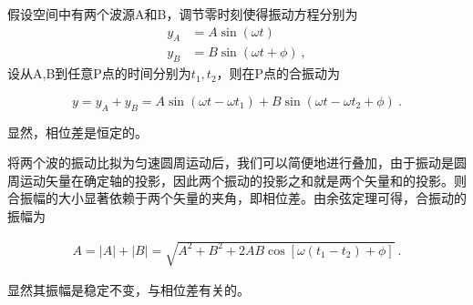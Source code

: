 假设空间中有两个波源A和B，调节零时刻使得振动方程分别为
\begin{equation}
\begin{aligned}
y_A&=A\sin(\omega t)\\
y_B&=B\sin (\omega t+\phi)~,
\end{aligned}
\end{equation}
设从A,B到任意P点的时间分别为$t_1,t_2$，则在P点的合振动为

\begin{equation}
y=y_A+y_B=A\sin(\omega t-\omega t_1)+B\sin(\omega t-\omega t_2+\phi)~.
\end{equation}

显然，相位差是恒定的。

将两个波的振动比拟为匀速圆周运动后，我们可以简便地进行叠加，由于振动是圆周运动矢量在确定轴的投影，因此两个振动的投影之和就是两个矢量和的投影。则合振幅的大小显著依赖于两个矢量的夹角，即相位差。由余弦定理可得，合振动的振幅为


\begin{equation}
\begin{aligned}
A=|A|+|B|=\sqrt{A^2+B^2+2AB\cos[\omega(t_1-t_2)+\phi]}~.
\end{aligned}
\end{equation}


显然其振幅是稳定不变，与相位差有关的。